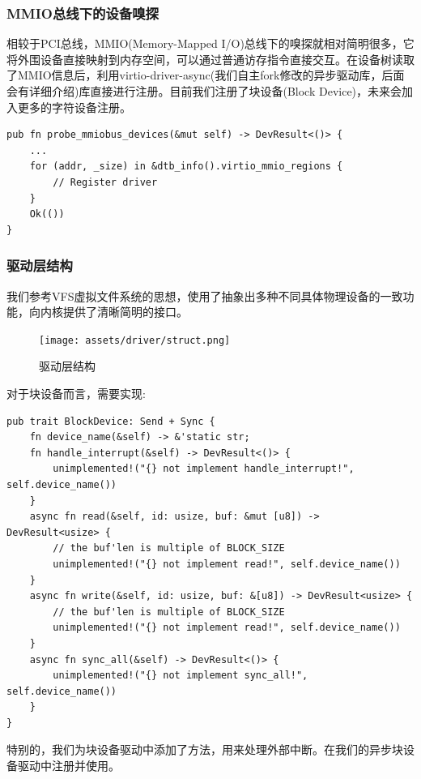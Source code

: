 \documentclass{article}
\begin{document}
\subsubsection{MMIO总线下的设备嗅探}
相较于PCI总线，MMIO(Memory-Mapped I/O)总线下的嗅探就相对简明很多，它将外围设备直接映射到内存空间，可以通过普通访存指令直接交互。在设备树读取了MMIO信息后，利用virtio-driver-async(我们自主fork修改的异步驱动库，后面会有详细介绍)库直接进行注册。目前我们注册了块设备(Block Device)，未来会加入更多的字符设备注册。

\begin{lstlisting}
pub fn probe_mmiobus_devices(&mut self) -> DevResult<()> {
    ...
    for (addr, _size) in &dtb_info().virtio_mmio_regions {
        // Register driver
    }
    Ok(())
}
\end{lstlisting}

\subsubsection{驱动层结构}

我们参考VFS虚拟文件系统的思想，使用了抽象出多种不同具体物理设备的一致功能，向内核提供了清晰简明的接口。

\begin{figure}[H]
    \centering
    \texttt{[image: assets/driver/struct.png]}
    \caption{驱动层结构}
    \label{驱动层结构}
\end{figure}

对于块设备而言，需要实现:

\begin{lstlisting}
pub trait BlockDevice: Send + Sync {
    fn device_name(&self) -> &'static str;
    fn handle_interrupt(&self) -> DevResult<()> {
        unimplemented!("{} not implement handle_interrupt!", self.device_name())
    }
    async fn read(&self, id: usize, buf: &mut [u8]) -> DevResult<usize> {
        // the buf'len is multiple of BLOCK_SIZE
        unimplemented!("{} not implement read!", self.device_name())
    }
    async fn write(&self, id: usize, buf: &[u8]) -> DevResult<usize> {
        // the buf'len is multiple of BLOCK_SIZE
        unimplemented!("{} not implement read!", self.device_name())
    }
    async fn sync_all(&self) -> DevResult<()> {
        unimplemented!("{} not implement sync_all!", self.device_name())
    }
}
\end{lstlisting}

特别的，我们为块设备驱动中添加了方法，用来处理外部中断。在我们的异步块设备驱动中注册并使用。
\end{document}
